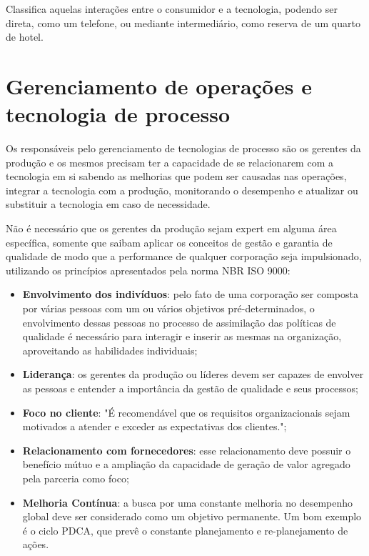 			Classifica aquelas interações entre o consumidor e a tecnologia, podendo ser direta, como um telefone, ou mediante intermediário, como reserva de um quarto de hotel. \cite{slack}

	\section[Gerenciamento de operações e tecnologia de processo]{Gerenciamento de operações e tecnologia de processo}
	\label{sec:tecnologias_Gerenciamento}
		
		Os responsáveis pelo gerenciamento de tecnologias de processo são os gerentes da produção e os mesmos precisam ter a capacidade de se relacionarem com a tecnologia em si sabendo as melhorias que podem ser causadas nas operações, integrar a tecnologia com a produção, monitorando o desempenho e atualizar ou substituir a tecnologia em caso de necessidade. 
		
		Não é necessário que os gerentes da produção sejam expert em alguma área específica, somente que saibam aplicar os conceitos de gestão e garantia de qualidade de modo que a performance de qualquer corporação seja impulsionado, utilizando os princípios apresentados pela norma NBR ISO 9000: \cite{lecom}

		\begin{itemize}
			\item{\textbf{Envolvimento dos indivíduos}: pelo fato de uma corporação ser composta por várias pessoas com um ou vários objetivos pré-determinados, o envolvimento dessas pessoas no processo de assimilação das políticas de qualidade é necessário para interagir e inserir as mesmas na organização, aproveitando as habilidades individuais;}
			\item{\textbf{Liderança}: os gerentes da produção ou líderes devem ser capazes de envolver as pessoas e entender a importância da gestão de qualidade e seus processos;}
			\item{\textbf{Foco no cliente}: "É recomendável que os requisitos organizacionais sejam motivados a atender e exceder as expectativas dos clientes.";}
			\item{\textbf{Relacionamento com fornecedores}: esse relacionamento deve possuir o benefício mútuo e a ampliação da capacidade de geração de valor agregado pela parceria como foco;}
			\item{\textbf{Melhoria Contínua}: a busca por uma constante melhoria no desempenho global deve ser considerado como um objetivo permanente. Um bom exemplo é o ciclo PDCA, que prevê o constante planejamento e re-planejamento de ações.}
		\end{itemize}

